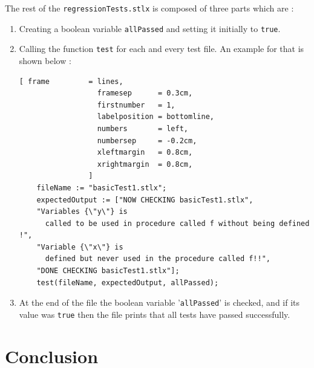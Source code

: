 \documentclass[11pt]{report}
\begin{document}
The rest of the \texttt{regressionTests.stlx} is composed of three parts which are :
\begin{enumerate}
\item Creating a boolean variable \texttt{allPassed} and setting it initially to \texttt{true}.

\item Calling the function \texttt{test} for each and every test file. An example for that is shown below :
\begin{Verbatim}[ frame         = lines, 
                  framesep      = 0.3cm, 
                  firstnumber   = 1,
                  labelposition = bottomline,
                  numbers       = left,
                  numbersep     = -0.2cm,
                  xleftmargin   = 0.8cm,
                  xrightmargin  = 0.8cm,
                ]
    fileName := "basicTest1.stlx";
    expectedOutput := ["NOW CHECKING basicTest1.stlx", 
	"Variables {\"y\"} is 
	  called to be used in procedure called f without being defined !", 
	"Variable {\"x\"} is 
	  defined but never used in the procedure called f!!", 
	"DONE CHECKING basicTest1.stlx"];
    test(fileName, expectedOutput, allPassed);
\end{Verbatim}

\item At the end of the file the boolean variable '\texttt{allPassed}' is checked, and if its value was \texttt{true} then the file prints that all tests have passed successfully.
\end{enumerate}


\chapter{Conclusion}
\end{document}
